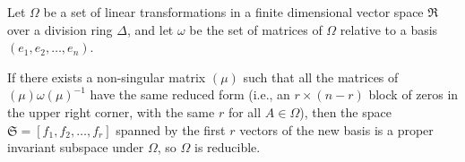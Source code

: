 Let $\Omega$ be a set of linear transformations in a finite dimensional vector space $\Re$ over a division ring $\Delta$, and let $\omega$ be the set of matrices of $\Omega$ relative to a basis $(e_1, e_2, \ldots, e_n)$.

If there exists a non-singular matrix $(\mu)$ such that all the matrices of $(\mu)\omega(\mu)^{-1}$ have the same reduced form (i.e., an $r \times (n-r)$ block of zeros in the upper right corner, with the same $r$ for all $A \in \Omega$), then the space $\mathfrak{S} = [f_1, f_2, \ldots, f_r]$ spanned by the first $r$ vectors of the new basis is a proper invariant subspace under $\Omega$, so $\Omega$ is reducible.
